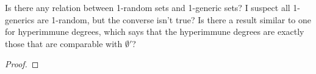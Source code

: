 \begin{question}
  Is there any relation between 1-random sets and 1-generic sets? I
  suspect all 1-generics are 1-random, but the converse isn't true? Is
  there a result similar to one for hyperimmune degrees, which says
  that the hyperimmune degrees are exactly those that are comparable
  with $\emptyset'$?
\end{question}
\begin{proof}
\end{proof}
